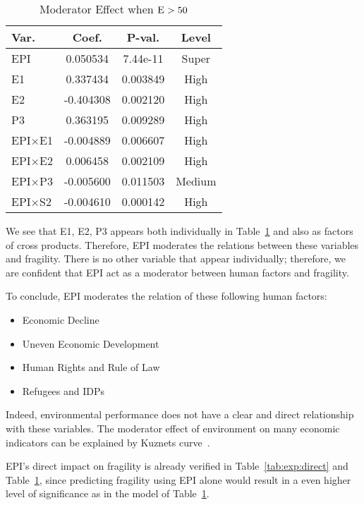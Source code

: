 \begin{table}[htbp]
    \centering
   \begin{tabular}{|l|ccc|}\hline
      Var. & Coef. & P-val. & Level \\ \hline
      EPI & 0.050534 & 7.44e-11 & Super \\ \hline
      E1 & 0.337434 & 0.003849 & High \\ \hline
      E2 & -0.404308 & 0.002120 & High \\ \hline
      P3 & 0.363195 & 0.009289 & High \\ \hline
      EPI$\times$E1 & -0.004889 & 0.006607 & High \\ \hline
      EPI$\times$E2 & 0.006458 & 0.002109 & High \\ \hline
      EPI$\times$P3 & -0.005600 & 0.011503 & Medium \\ \hline
      EPI$\times$S2 & -0.004610 & 0.000142 & High \\ \hline
   \end{tabular} 
   \caption{Moderator Effect when $\operatorname*{E} > 50$}
   \label{tab:exp:indirect:moderator:case1}
\end{table}

We see that E1, E2, P3 appears both individually in Table~\ref{tab:exp:indirect:moderator:case1} and also as factors of cross products. Therefore, EPI moderates the relations between these variables and fragility. There is no other variable that appear individually; therefore, we are confident that EPI act as a moderator between human factors and fragility.

To conclude,
EPI moderates the relation of these following human factors:
\begin{itemize}
    \item Economic Decline
    \item Uneven Economic Development
    \item Human Rights and Rule of Law
    \item Refugees and IDPs 
\end{itemize}
Indeed, environmental performance does not have a clear and direct relationship with these variables. The moderator effect of environment on many economic indicators can be explained by Kuznets curve~.


EPI's direct impact on fragility is already verified in Table~\ref{tab:exp:direct} and Table~\ref{tab:exp:indirect:moderator:case1}, since predicting fragility using EPI alone would result in a even higher level of significance as in the model of Table~\ref{tab:exp:indirect:moderator:case1}.

